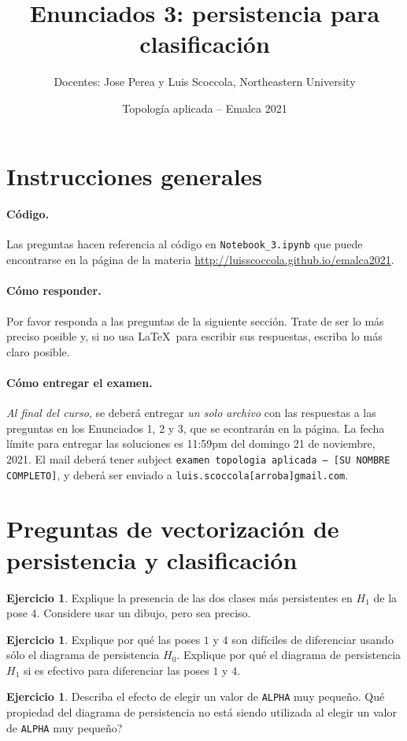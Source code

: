 \documentclass[12pt,reqno,oneside]{article}
\title{Enunciados 3: persistencia para clasificaci\'on}
\date{Topolog\'{i}a aplicada -- Emalca 2021 }
\author{Docentes: Jose Perea y Luis Scoccola, Northeastern University}
\DeclareRobustCommand\squelch[1]{%
    \BeginAccSupp{method=plain,ActualText={}}#1\EndAccSupp{}}
\theoremstyle{definition}
\newtheorem{pregunta}[theorem]{Ejercicio}
\begin{document}
\maketitle

\section{Instrucciones generales}
%
\paragraph{C\'odigo.}
Las preguntas hacen referencia al c\'odigo en \texttt{Notebook\_3.ipynb} que puede encontrarse en la p\'agina de la materia
\url{http://luisscoccola.github.io/emalca2021}.

\paragraph{C\'omo responder.}
Por favor responda a las preguntas de la siguiente secci\'on. 
Trate de ser lo m\'as preciso posible y, si no usa \LaTeX~para escribir sus respuestas, escriba lo m\'as claro posible.

\paragraph{C\'omo entregar el examen.}
\textit{Al final del curso}, se deber\'a entregar \textit{un solo archivo} con las respuestas a las preguntas en los Enunciados 1, 2 y 3, que se econtrar\'an en la p\'agina.
La fecha l\'imite para entregar las soluciones es 11:59pm del domingo 21 de noviembre, 2021.
El mail deber\'a tener subject \texttt{examen topologia aplicada -- [SU NOMBRE COMPLETO]}, y deber\'a ser enviado a \squelch{\texttt{luis.scoccola[arroba]gmail.com}}.

\section{Preguntas de vectorizaci\'on de persistencia y clasificaci\'on}

\begin{pregunta}
	Explique la presencia de las dos clases m\'as persistentes en $H_1$ de la pose $4$.
	Considere usar un dibujo, pero sea preciso.
\end{pregunta}

\begin{pregunta}
	Explique por qu\'e las poses $1$ y $4$ son dif\'iciles de diferenciar usando s\'olo el diagrama de persistencia $H_0$.
	Explique por qu\'e el diagrama de persistencia $H_1$ si es efectivo para diferenciar las poses $1$ y $4$.
\end{pregunta}

\begin{pregunta}
	Describa el efecto de elegir un valor de \texttt{ALPHA} muy peque\~no.
	Qu\'e propiedad del diagrama de persistencia no est\'a siendo utilizada al elegir un valor de \texttt{ALPHA} muy peque\~no?
\end{pregunta}
\end{document}
